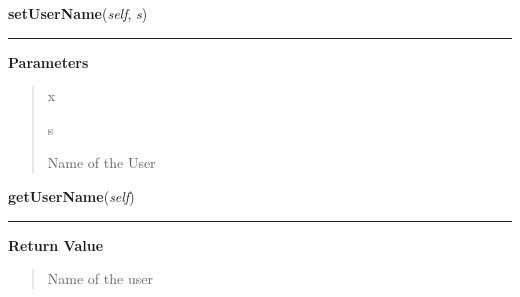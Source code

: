     \vspace{0.5ex}

\hspace{.8\funcindent}\begin{boxedminipage}{\funcwidth}

    \raggedright \textbf{setUserName}(\textit{self}, \textit{s})

    \vspace{-1.5ex}

    \rule{\textwidth}{0.5\fboxrule}
\setlength{\parskip}{2ex}
\setlength{\parskip}{1ex}
      \textbf{Parameters}
      \vspace{-1ex}

      \begin{quote}
        \begin{Ventry}{x}

          \item[s]

          Name of the User

        \end{Ventry}

      \end{quote}

    \end{boxedminipage}

    \label{cuon:User:user:User:getUserName}

    \vspace{0.5ex}

\hspace{.8\funcindent}\begin{boxedminipage}{\funcwidth}

    \raggedright \textbf{getUserName}(\textit{self})

    \vspace{-1.5ex}

    \rule{\textwidth}{0.5\fboxrule}
\setlength{\parskip}{2ex}
\setlength{\parskip}{1ex}
      \textbf{Return Value}
    \vspace{-1ex}

      \begin{quote}
      Name of the user

      \end{quote}

    \end{boxedminipage}


